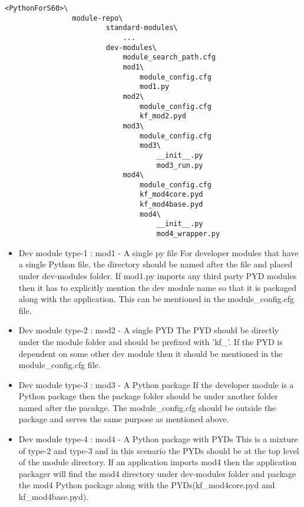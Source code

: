 \begin{verbatim}
<PythonForS60>\
                module-repo\
                        standard-modules\
                            ...
                        dev-modules\
                            module_search_path.cfg
                            mod1\
                                module_config.cfg
                                mod1.py
                            mod2\
                                module_config.cfg
                                kf_mod2.pyd
                            mod3\
                                module_config.cfg
                                mod3\
                                    __init__.py
                                    mod3_run.py
                            mod4\
                                module_config.cfg
                                kf_mod4core.pyd
                                kf_mod4base.pyd
                                mod4\
                                    __init__.py
                                    mod4_wrapper.py
\end{verbatim}

\begin {itemize}
\item Dev module type-1 : mod1 - A single py file \break
For developer modules that have a single Python file, the directory should be
named after the file and placed under dev-modules folder. If mod1.py imports any
third party PYD modules then it has to explicitly mention the dev module name
so that it is packaged along with the application. This can be mentioned in the
module_config.cfg file.

\item Dev module type-2 : mod2 - A single PYD \break
The PYD should be directly under the module folder and should be prefixed
with 'kf_'. If the PYD is dependent on some other dev module then it should be
mentioned in the module_config.cfg file.

\item Dev module type-3 : mod3 - A Python package \break
If the developer module is a Python package then the package folder should be
under another folder named after the pacakge. The module_config.cfg should be
outside the package and serves the same purpose as mentioned above.

\item Dev module type-4 : mod4 - A Python package with PYDs \break
This is a mixture of type-2 and type-3 and in this scenario the PYDs should be
at the top level of the module directory. If an application imports mod4 then
the application packager will find the mod4 directory under dev-modules folder
and package the mod4 Python package along with the PYDs(kf_mod4core.pyd and
kf_mod4base.pyd).
\end {itemize}


